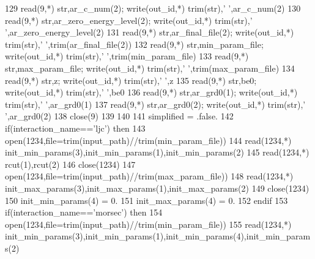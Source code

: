 \begin{DoxyCode}
129     \textcolor{keyword}{read}(9,*) str,ar\_c\_num(2);              \textcolor{keyword}{write}(out\_id,*) trim(str),\textcolor{stringliteral}{'  '},ar\_c\_num(2)
130     \textcolor{keyword}{read}(9,*) str,ar\_zero\_energy\_level(2);  \textcolor{keyword}{write}(out\_id,*) trim(str),\textcolor{stringliteral}{'  '},ar\_zero\_energy\_level(2)
131     \textcolor{keyword}{read}(9,*) str,ar\_final\_file(2);         \textcolor{keyword}{write}(out\_id,*) trim(str),\textcolor{stringliteral}{'  '},trim(ar\_final\_file(2))
132     \textcolor{keyword}{read}(9,*) str,min\_param\_file;           \textcolor{keyword}{write}(out\_id,*) trim(str),\textcolor{stringliteral}{'  '},trim(min\_param\_file)
133     \textcolor{keyword}{read}(9,*) str,max\_param\_file;           \textcolor{keyword}{write}(out\_id,*) trim(str),\textcolor{stringliteral}{'  '},trim(max\_param\_file)
134     \textcolor{keyword}{read}(9,*) str,z;                        \textcolor{keyword}{write}(out\_id,*) trim(str),\textcolor{stringliteral}{'  '},z
135     \textcolor{keyword}{read}(9,*) str,be0;                      \textcolor{keyword}{write}(out\_id,*) trim(str),\textcolor{stringliteral}{'  '},be0
136     \textcolor{keyword}{read}(9,*) str,ar\_grd0(1);               \textcolor{keyword}{write}(out\_id,*) trim(str),\textcolor{stringliteral}{'  '},ar\_grd0(1)
137     \textcolor{keyword}{read}(9,*) str,ar\_grd0(2);               \textcolor{keyword}{write}(out\_id,*) trim(str),\textcolor{stringliteral}{'  '},ar\_grd0(2)
138     \textcolor{keyword}{close}(9)
139 
140 
141     simplified = .false.
142     \textcolor{keywordflow}{if}(interaction\_name==\textcolor{stringliteral}{'ljc'}) \textcolor{keywordflow}{then}
143         \textcolor{keyword}{open}(1234,file=trim(input\_path)//trim(min\_param\_file))
144         \textcolor{keyword}{read}(1234,*) init\_min\_params(3),init\_min\_params(1),init\_min\_params(2)
145         \textcolor{keyword}{read}(1234,*) rcut(1),rcut(2)
146         \textcolor{keyword}{close}(1234)
147         \textcolor{keyword}{open}(1234,file=trim(input\_path)//trim(max\_param\_file))
148         \textcolor{keyword}{read}(1234,*) init\_max\_params(3),init\_max\_params(1),init\_max\_params(2)
149         \textcolor{keyword}{close}(1234)
150         init\_min\_params(4) = 0.
151         init\_max\_params(4) = 0.
152 \textcolor{keywordflow}{    endif}
153     \textcolor{keywordflow}{if}(interaction\_name==\textcolor{stringliteral}{'morsec'}) \textcolor{keywordflow}{then}
154         \textcolor{keyword}{open}(1234,file=trim(input\_path)//trim(min\_param\_file))
155         \textcolor{keyword}{read}(1234,*) init\_min\_params(3),init\_min\_params(1),init\_min\_params(4),init\_min\_params(2)

\end{DoxyCode}
